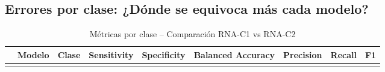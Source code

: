 \documentclass[
]{article}
\begin{document}
\subsection{Errores por clase: ¿Dónde se equivoca más cada
modelo?}\label{errores-por-clase-duxf3nde-se-equivoca-muxe1s-cada-modelo}

\begin{longtable}[]{@{}
  >{\raggedright\arraybackslash}p{}
  >{\raggedright\arraybackslash}p{}
  >{\raggedright\arraybackslash}p{}
  >{\raggedleft\arraybackslash}p{}
  >{\raggedleft\arraybackslash}p{}
  >{\raggedleft\arraybackslash}p{}
  >{\raggedleft\arraybackslash}p{}
  >{\raggedleft\arraybackslash}p{}
  >{\raggedleft\arraybackslash}p{}@{}}
\caption{Métricas por clase -- Comparación RNA-C1 vs
RNA-C2}\tabularnewline
\toprule\noalign{}
\begin{minipage}[b]{\linewidth}\raggedright
\end{minipage} & \begin{minipage}[b]{\linewidth}\raggedright
Modelo
\end{minipage} & \begin{minipage}[b]{\linewidth}\raggedright
Clase
\end{minipage} & \begin{minipage}[b]{\linewidth}\raggedleft
Sensitivity
\end{minipage} & \begin{minipage}[b]{\linewidth}\raggedleft
Specificity
\end{minipage} & \begin{minipage}[b]{\linewidth}\raggedleft
Balanced Accuracy
\end{minipage} & \begin{minipage}[b]{\linewidth}\raggedleft
Precision
\end{minipage} & \begin{minipage}[b]{\linewidth}\raggedleft
Recall
\end{minipage} & \begin{minipage}[b]{\linewidth}\raggedleft
F1
\end{minipage} \\
\midrule\noalign{}

\end{longtable}
\end{document}
